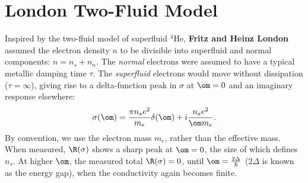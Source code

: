 \documentclass[a4paper, 11pt, normalem]{report}
\begin{document}
\section{London Two-Fluid Model}
Inspired by the two-fluid model of superfluid $^4$He, \textbf{Fritz and Heinz London} assumed the electron density $n$ to be divisible into superfluid and normal components: $n=n_s+n_n$.
The \emph{normal} electrons were assumed to have a typical metallic damping time $\tau$.
The \emph{superfluid} electrons would move without dissipation ($\tau=\infty$), giving rise to a delta-function peak in $\sigma$ at $\om=0$ and an imaginary response elsewhere:
\begin{align}
    \sigma(\om) = \frac{\pi n_se^2}{m_e}\delta(\om) + i\frac{n_se^2}{\om m_e}.
\end{align}
By convention, we use the electron mass $m_e$, rather than the effective mass.
When measured, $\R(\sigma)$ shows a sharp peak at $\om=0$, the size of which defines $n_s$.
At higher $\om$, the measured total $\R(\sigma)=0$, until $\om=\frac{2\Delta}{\hbar}$ ($2\Delta$ is known as the energy gap), when the conductivity again becomes finite.
\end{document}

